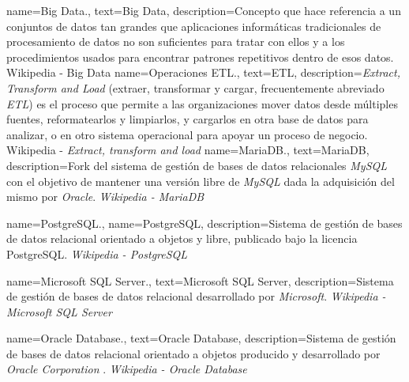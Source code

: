 {
    name={Big Data.},
    text={Big Data},
    description={Concepto que hace referencia a un conjuntos de datos tan grandes que aplicaciones informáticas tradicionales de procesamiento de datos no son suficientes para tratar con ellos y a los procedimientos usados para encontrar patrones repetitivos dentro de esos datos. {Wikipedia - Big Data} \cite{wikibigdata}}
}
{
    name={Operaciones ETL.},
    text={ETL},
    description={\textit{Extract, Transform and Load} (extraer, transformar y cargar, frecuentemente abreviado \textit{ETL}) es el proceso que permite a las organizaciones mover datos desde múltiples fuentes, reformatearlos y limpiarlos, y cargarlos en otra base de datos para analizar, o en otro sistema operacional para apoyar un proceso de negocio. {Wikipedia - \textit{Extract, transform and load}} \cite{wikietl}}
}
{
    name={MariaDB.},
    text={MariaDB},
    description={Fork del sistema de gestión de bases de datos relacionales \textit{MySQL} con el objetivo de mantener una versión libre de \textit{MySQL} dada la adquisición del mismo por \textit{Oracle}. \textit{Wikipedia - MariaDB} \cite{wikimariadb}}
}

{
    name={PostgreSQL.},
    name={PostgreSQL},
    description={Sistema de gestión de bases de datos relacional orientado a objetos y libre, publicado bajo la licencia PostgreSQL. \textit{Wikipedia - PostgreSQL} \cite{wikipostgresql}}
}

{
    name={Microsoft SQL Server.},
    text={Microsoft SQL Server},
    description={Sistema de gestión de bases de datos relacional desarrollado por \textit{Microsoft}. \textit{Wikipedia - Microsoft SQL Server} \cite{wikimssql}}
}

{
    name={Oracle Database.},
    text={Oracle Database},
    description={Sistema de gestión de bases de datos relacional orientado a objetos producido y desarrollado por \textit{Oracle Corporation} \cite{oraclecorporation}. \textit{Wikipedia - Oracle Database} \cite{wikioracle}}
}





